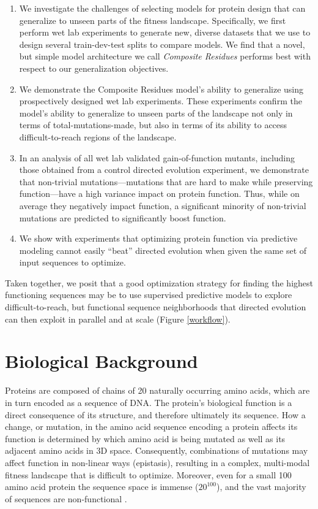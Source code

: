 \begin{enumerate}[noitemsep]
  \item We investigate the challenges of selecting models for protein design that can generalize to unseen parts of the fitness landscape. Specifically, we first perform wet lab experiments to generate new, diverse datasets that we use to design several train-dev-test splits to compare models. We find that a novel, but simple model architecture we call \textit{Composite Residues} performs best with respect to our generalization objectives.

  \item We demonstrate the Composite Residues model’s ability to generalize using prospectively designed wet lab experiments. These experiments confirm the model’s ability to generalize to unseen parts of the landscape not only in terms of total-mutations-made, but also in terms of its ability to access difficult-to-reach regions of the landscape.

  \item In an analysis of all wet lab validated gain-of-function mutants, including those obtained from a control directed evolution experiment, we demonstrate that non-trivial mutations---mutations that are hard to make while preserving function---have a high variance impact on protein function. Thus, while on average they negatively impact function, a significant minority of non-trivial mutations are predicted to significantly boost function.
  
  \item We show with experiments that optimizing protein function via predictive modeling cannot easily ``beat'' directed evolution when given the same set of input sequences to optimize. 
\end{enumerate}

Taken together, we posit that a good optimization strategy for finding the highest functioning sequences may be to use supervised predictive models to explore difficult-to-reach, but functional sequence neighborhoods that directed evolution can then exploit in parallel and at scale (Figure \ref{workflow}). 

\section{Biological Background}


Proteins are composed of chains of 20 naturally occurring amino acids, which are in turn encoded as a sequence of DNA. The protein’s biological function is a direct consequence of its structure, and therefore ultimately its sequence. How a change, or mutation, in the amino acid sequence encoding a protein affects its function is determined by which amino acid is being mutated as well as its adjacent amino acids in 3D space. Consequently, combinations of mutations may affect function in non-linear ways (epistasis), resulting in a complex, multi-modal fitness landscape that is difficult to optimize. Moreover, even for a small 100 amino acid protein the sequence space is immense ($20^{100}$), and the vast majority of sequences are non-functional \cite{Smith1970-xh}.


